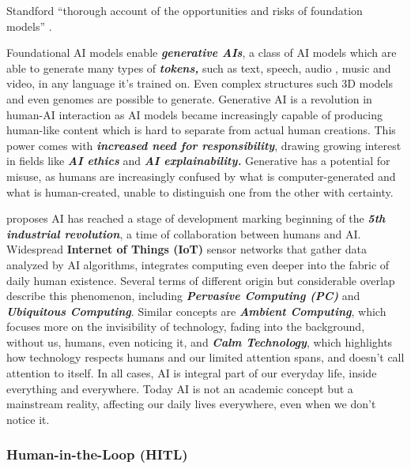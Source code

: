 \documentclass[
  letterpaper,
  DIV=11,
  numbers=noendperiod]{scrartcl}
\begin{document}
Standford ``thorough account of the opportunities and risks of
foundation models'' \citep{bommasaniOpportunitiesRisksFoundation2021}.

Foundational AI models enable \textbf{\emph{generative AIs}}, a class of
AI models which are able to generate many types of
\textbf{\emph{tokens,}} such as text, speech, audio
\citep{sanroman2023fromdi, kreukAudioGenTextuallyGuided2022}, music
\citep{copetSimpleControllableMusic2023, metaaiAudioCraftSimpleOnestop2023}
and video, in any language it's trained on. Even complex structures such
3D models and even genomes are possible to generate. Generative AI is a
revolution in human-AI interaction as AI models became increasingly
capable of producing human-like content which is hard to separate from
actual human creations. This power comes with \textbf{\emph{increased
need for responsibility}}, drawing growing interest in fields like
\textbf{\emph{AI ethics}} and \textbf{\emph{AI explainability.}}
Generative has a potential for misuse, as humans are increasingly
confused by what is computer-generated and what is human-created, unable
to distinguish one from the other with certainty.

\citep{nobleFifthIndustrialRevolution2022} proposes AI has reached a
stage of development marking beginning of the \textbf{\emph{5th
industrial revolution}}, a time of collaboration between humans and AI.
Widespread \textbf{Internet of Things (IoT)} sensor networks that gather
data analyzed by AI algorithms, integrates computing even deeper into
the fabric of daily human existence. Several terms of different origin
but considerable overlap describe this phenomenon, including
\textbf{\emph{Pervasive Computing (PC)}}
\citep{rogersFourPhasesPervasive2022} and \textbf{\emph{Ubiquitous
Computing}}. Similar concepts are \textbf{\emph{Ambient Computing}},
which focuses more on the invisibility of technology, fading into the
background, without us, humans, even noticing it, and \textbf{\emph{Calm
Technology}}, which highlights how technology respects humans and our
limited attention spans, and doesn't call attention to itself. In all
cases, AI is integral part of our everyday life, inside everything and
everywhere. Today AI is not an academic concept but a mainstream
reality, affecting our daily lives everywhere, even when we don't notice
it.

\subsubsection{Human-in-the-Loop (HITL)}\label{human-in-the-loop-hitl}
\end{document}

